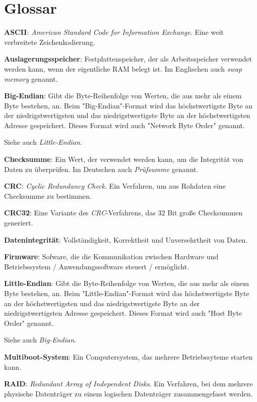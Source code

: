 \section{Glossar}

\textbf{ASCII}:
\textit{American Standard Code for Information Exchange}. Eine weit verbreitete Zeichenkodierung.

\textbf{Auslagerungsspeicher}:
Festplattenspeicher, der als Arbeitsspeicher verwendet werden kann, wenn der eigentliche RAM belegt ist.
Im Englischen auch \textit{swap memory} genannt.

\textbf{Big-Endian}:
Gibt die Byte-Reihenfolge von Werten, die aus mehr als einem Byte bestehen, an.
Beim "Big-Endian"-Format wird das höchstwertigste Byte an der niedrigstwertigsten und das niedrigstwertigste Byte an der höchstwertigsten Adresse gespeichert.
Dieses Format wird auch "Network Byte Order" genannt.

Siehe auch \textit{Little-Endian}.

\textbf{Checksumme}:
Ein Wert, der verwendet werden kann, um die Integrität von Daten zu überprüfen.
Im Deutschen auch \textit{Prüfsumme} genannt.

\textbf{CRC}:
\textit{Cyclic Redundancy Check}.
Ein Verfahren, um aus Rohdaten eine Checksumme zu bestimmen.

\textbf{CRC32}:
Eine Variante des \textit{CRC}-Verfahrens, das 32 Bit große Checksummen generiert.

\textbf{Datenintegrität}:
Vollständigkeit, Korrektheit und Unversehrtheit von Daten. 

\textbf{Firmware}:
Sofware, die die Kommunikation zwischen Hardware und Betriebssystem / Anwendungssoftware steuert / ermöglicht.

\textbf{Little-Endian}:
Gibt die Byte-Reihenfolge von Werten, die aus mehr als einem Byte bestehen, an.
Beim "Little-Endian"-Format wird das höchstwertigste Byte an der höchstwertigsten und das niedrigstwertigste Byte an der niedrigstwertigsten Adresse gespeichert.
Dieses Format wird auch "Host Byte Order" genannt.

Siehe auch \textit{Big-Endian}.

\textbf{Multiboot-System}:
Ein Computersystem, das mehrere Betriebssyteme starten kann.

\textbf{RAID}:
\textit{Redundant Array of Independent Disks}.
Ein Verfahren, bei dem mehrere physische Datenträger zu einem logischen Datenträger zusammengefasst werden.
